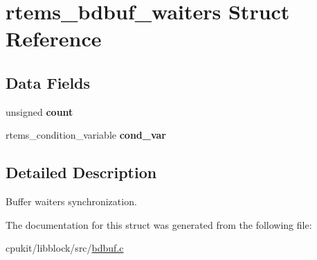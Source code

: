 \hypertarget{structrtems__bdbuf__waiters}{}\section{rtems\+\_\+bdbuf\+\_\+waiters Struct Reference}
\label{structrtems__bdbuf__waiters}
\subsection*{Data Fields}
\begin{DoxyCompactItemize}
\item 
\mbox{\label{structrtems__bdbuf__waiters_ad484811895c463cadf0f055a4568d0be}} 
unsigned {\bfseries count}
\item 
\mbox{\label{structrtems__bdbuf__waiters_aae795eb7abed63816a771e5f68016552}} 
rtems\+\_\+condition\+\_\+variable {\bfseries cond\+\_\+var}
\end{DoxyCompactItemize}


\subsection{Detailed Description}
Buffer waiters synchronization. 

The documentation for this struct was generated from the following file\+:\begin{DoxyCompactItemize}
\item 
cpukit/libblock/src/\mbox{\hyperlink{bdbuf_8c}{bdbuf.\+c}}\end{DoxyCompactItemize}
